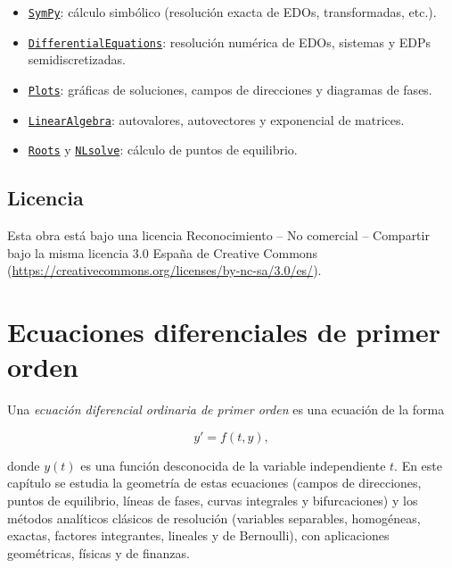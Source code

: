 \documentclass[
  spanish,
  a4paper,
]{scrreport}
\providecommand{\tightlist}{%
  \setlength{\itemsep}{0pt}\setlength{\parskip}{0pt}}
\theoremstyle{definition}
\theoremstyle{remark}
\begin{document}
\begin{itemize}
\tightlist
\item
  \href{https://github.com/JuliaPy/SymPy.jl}{\texttt{SymPy}}: cálculo
  simbólico (resolución exacta de EDOs, transformadas, etc.).
\item
  \href{https://docs.sciml.ai/DiffEqDocs/stable/}{\texttt{DifferentialEquations}}:
  resolución numérica de EDOs, sistemas y EDPs semidiscretizadas.
\item
  \href{https://docs.juliaplots.org/}{\texttt{Plots}}: gráficas de
  soluciones, campos de direcciones y diagramas de fases.
\item
  \href{https://docs.julialang.org/en/v1/stdlib/LinearAlgebra/}{\texttt{LinearAlgebra}}:
  autovalores, autovectores y exponencial de matrices.
\item
  \href{https://github.com/JuliaMath/Roots.jl}{\texttt{Roots}} y
  \href{https://github.com/JuliaNLSolvers/NLsolve.jl}{\texttt{NLsolve}}:
  cálculo de puntos de equilibrio.
\end{itemize}

\section*{Licencia}\label{licencia}


Esta obra está bajo una licencia Reconocimiento -- No comercial --
Compartir bajo la misma licencia 3.0 España de Creative Commons
(\url{https://creativecommons.org/licenses/by-nc-sa/3.0/es/}).


\chapter{Ecuaciones diferenciales de primer
orden}\label{ecuaciones-diferenciales-de-primer-orden}

Una \emph{ecuación diferencial ordinaria de primer orden} es una
ecuación de la forma

\[
y' = f(t, y),
\]

donde \(y(t)\) es una función desconocida de la variable independiente
\(t\). En este capítulo se estudia la geometría de estas ecuaciones
(campos de direcciones, puntos de equilibrio, líneas de fases, curvas
integrales y bifurcaciones) y los métodos analíticos clásicos de
resolución (variables separables, homogéneas, exactas, factores
integrantes, lineales y de Bernoulli), con aplicaciones geométricas,
físicas y de finanzas.
\end{document}
